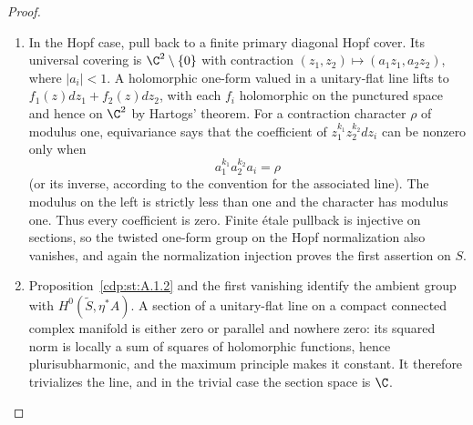 \begin{proof}
\begin{enumerate}[label=\arabic*.,leftmargin=*]
\item In the Hopf case, pull back to a finite primary diagonal Hopf cover. Its universal covering is $\C^2\setminus\{0\}$ with contraction $(z_1,z_2)\mapsto(a_1z_1,a_2z_2)$, where $|a_i|<1$. A holomorphic one-form valued in a unitary-flat line lifts to $f_1(z)dz_1+f_2(z)dz_2$, with each $f_i$ holomorphic on the punctured space and hence on $\C^2$ by Hartogs' theorem. For a contraction character $\rho$ of modulus one, equivariance says that the coefficient of $z_1^{k_1}z_2^{k_2}dz_i$ can be nonzero only when
\[
 a_1^{k_1}a_2^{k_2}a_i=\rho
\]
(or its inverse, according to the convention for the associated line). The modulus on the left is strictly less than one and the character has modulus one. Thus every coefficient is zero. Finite \'etale pullback is injective on sections, so the twisted one-form group on the Hopf normalization also vanishes, and again the normalization injection proves the first assertion on $S$.

\item Proposition~\ref{cdp:st:A.1.2} and the first vanishing identify the ambient group with $H^0(\widetilde S,\eta^*A)$. A section of a unitary-flat line on a compact connected complex manifold is either zero or parallel and nowhere zero: its squared norm is locally a sum of squares of holomorphic functions, hence plurisubharmonic, and the maximum principle makes it constant. It therefore trivializes the line, and in the trivial case the section space is $\C$.

\end{enumerate}
\end{proof}